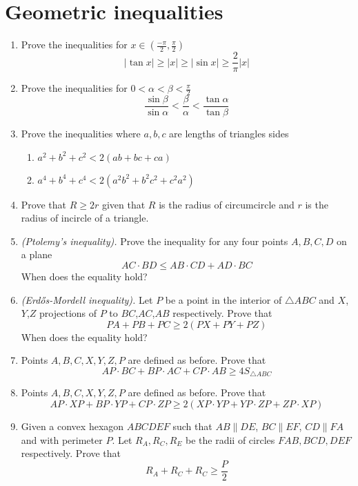 \documentclass{article}
\begin{document}
\section*{Geometric inequalities}
	\begin{enumerate}
		\item %
		Prove the inequalities for $x \in \left(\frac{-\pi}{2},\frac{\pi}{2}\right)$
		$$|\tan x| \geq |x| \geq |\sin x| \geq  \frac{2}{\pi}|x|$$
		\item %
		Prove the inequalities for $0 < \alpha < \beta < \frac{\pi}{2}$
		$$\frac{\sin \beta}{\sin \alpha} < \frac{\beta}{\alpha} < \frac{\tan \alpha}{\tan \beta}$$
		\item %
		Prove the inequalities where $a,b,c$ are lengths of triangles sides
		\begin{enumerate}
			\item $a^2 + b^2 + c^2 < 2 (ab + bc + ca)$
			\item $a^4 + b^4 + c^4 < 2 (a^2b^2 + b^2c^2 + c^2a^2)$
		\end{enumerate}  
		\item %
		Prove that $R \geq 2r$ given that $R$ is the radius of circumcircle and $r$ is the radius of incircle of a triangle.	
		\item \emph{(Ptolemy's inequality).}
		Prove the inequality for any four points $A,B,C,D$ on a plane
		$$AC \cdot BD \leq AB \cdot CD + AD \cdot BC$$	
		When does the equality hold?
		\item \emph{(Erdős-Mordell inequality).} %
		Let $P$ be a point in the interior of $\triangle ABC$ and $X$, $Y$,$Z$ projections of $P$ to $BC$,$AC$,$AB$ respectively. Prove that
		$$PA+PB+PC \geq 2(PX+PY+PZ)$$
		When does the equality hold?
		\item %
		Points $A,B,C,X,Y,Z,P$ are defined as before. Prove that
		$$AP \cdot BC + BP \cdot AC + CP \cdot AB \geq 4S_{\triangle ABC} $$
		\item %
		Points $A,B,C,X,Y,Z,P$ are defined as before. Prove that
		$$AP \cdot XP + BP \cdot YP + CP \cdot ZP \geq 2(XP \cdot YP + YP \cdot ZP + ZP \cdot XP) $$
		\item %
		Given a convex hexagon $ABCDEF$ such that $AB \parallel DE$, $BC \parallel EF$, $CD \parallel FA$ and with perimeter $P$. Let $R_A, R_C, R_E$ be the radii of circles $FAB,BCD,DEF$ respectively. Prove that
		$$R_A + R_C + R_C \geq \frac{P}{2} $$
		
	\end{enumerate}
\end{document}
